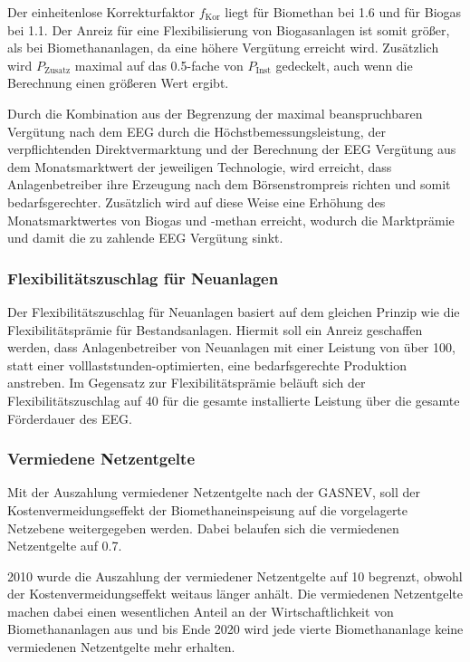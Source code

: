 Der einheitenlose Korrekturfaktor $f_{\text{Kor}}$ liegt für Biomethan bei \SI{1.6}{\relax} und für Biogas bei \SI{1.1}{\relax}. Der Anreiz für eine Flexibilisierung von Biogasanlagen ist somit größer, als bei Biomethananlagen, da eine höhere Vergütung erreicht wird. Zusätzlich wird $P_{\text{Zusatz}}$ maximal auf das \SI{0.5}{\relax}-fache von $P_{\text{Inst}}$ gedeckelt, auch wenn die Berechnung einen größeren Wert ergibt. \parencite{BJV2014} \parencite{NKGH-FP}\smallskip

Durch die Kombination aus der Begrenzung der maximal beanspruchbaren Vergütung nach dem \gls{EEG} durch die Höchstbemessungsleistung, der verpflichtenden Direktvermarktung und der Berechnung der \gls{EEG} Vergütung aus dem Monatsmarktwert der jeweiligen Technologie, wird erreicht, dass Anlagenbetreiber ihre Erzeugung nach dem Börsenstrompreis richten und somit bedarfsgerechter. Zusätzlich wird auf diese Weise eine Erhöhung des Monatsmarktwertes von Biogas und -methan erreicht, wodurch die Marktprämie und damit die zu zahlende EEG Vergütung sinkt.

\subsubsection{Flexibilitätszuschlag für Neuanlagen}

Der Flexibilitätszuschlag für Neuanlagen basiert auf dem gleichen Prinzip wie die Flexibilitätsprämie für Bestandsanlagen. Hiermit soll ein Anreiz geschaffen werden, dass Anlagenbetreiber von Neuanlagen mit einer Leistung von über \SI{100}{\kw}, statt einer volllaststunden-optimierten, eine bedarfsgerechte Produktion anstreben. Im Gegensatz zur Flexibilitätsprämie beläuft sich der Flexibilitätszuschlag auf \SI[per-mode=symbol]{40}{\Eurkw} für die gesamte installierte Leistung über die gesamte Förderdauer des \gls{EEG}. \parencite{BJV2014} \parencite{DanielGromke2019}

\subsubsection{Vermiedene Netzentgelte}\label{chap:law_vN}

Mit der Auszahlung vermiedener Netzentgelte nach der \gls{GASNEV}, soll der Kostenvermeidungseffekt der Biomethaneinspeisung auf die vorgelagerte Netzebene weitergegeben werden. Dabei belaufen sich die vermiedenen Netzentgelte auf \SI[per-mode=symbol]{0.7}{\ctkwh}.\smallskip

\SI{2010}{\relax} wurde die Auszahlung der vermiedener Netzentgelte auf \SI{10}{\Jahre} begrenzt, obwohl der Kostenvermeidungseffekt weitaus länger anhält. Die vermiedenen Netzentgelte machen dabei einen wesentlichen Anteil an der Wirtschaftlichkeit von Biomethananlagen aus und bis Ende \SI{2020}{\relax} wird jede vierte Biomethananlage keine vermiedenen Netzentgelte mehr erhalten. \parencite{dena2018}


